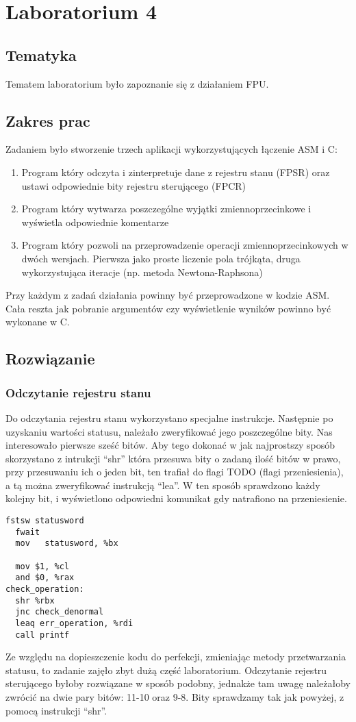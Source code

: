 \chapter{Laboratorium 4}

\section{Tematyka}
Tematem laboratorium było zapoznanie się z działaniem FPU.
\section{Zakres prac}
Zadaniem było stworzenie trzech aplikacji wykorzystujących łączenie ASM i C:
\begin{enumerate}
	\item Program który odczyta i zinterpretuje dane z rejestru stanu (FPSR) oraz ustawi odpowiednie bity rejestru sterującego (FPCR)
	\item Program który wytwarza poszczególne wyjątki zmiennoprzecinkowe i wyświetla odpowiednie komentarze
	\item Program który pozwoli na przeprowadzenie operacji zmiennoprzecinkowych w dwóch wersjach. Pierwsza jako proste liczenie pola trójkąta, druga wykorzystująca iteracje (np. metoda Newtona-Raphsona)
\end{enumerate}
Przy każdym z zadań działania powinny być przeprowadzone w kodzie ASM. Cała reszta jak pobranie argumentów czy wyświetlenie wyników powinno być wykonane w C.

\section{Rozwiązanie}
\subsection{Odczytanie rejestru stanu}
Do odczytania rejestru stanu wykorzystano specjalne instrukcje. Następnie po uzyskaniu wartości statusu, należało zweryfikować jego poszczególne bity. Nas interesowało pierwsze sześć bitów. Aby tego dokonać w jak najprostszy sposób skorzystano z intrukcji "`shr"' która przesuwa bity o zadaną ilość bitów w prawo, przy przesuwaniu ich o jeden bit, ten trafiał do flagi TODO (flagi przeniesienia), a tą można zweryfikować instrukcją "`lea"'. W ten sposób sprawdzono każdy kolejny bit, i wyświetlono odpowiedni komunikat gdy natrafiono na przeniesienie.
\begin{lstlisting}[frame=single, basicstyle=\small, caption=Odczytanie i weryfikacja rejestru stanu]
  fstsw	statusword
  fwait
  mov	statusword, %bx

  mov $1, %cl
  and $0, %rax
check_operation:
  shr %rbx
  jnc check_denormal
  leaq err_operation, %rdi
  call printf
\end{lstlisting}
Ze względu na dopieszczenie kodu do perfekcji, zmieniając metody przetwarzania statusu, to zadanie zajęło zbyt dużą część laboratorium. Odczytanie rejestru sterującego byłoby rozwiązane w sposób podobny, jednakże tam uwagę należałoby zwrócić na dwie pary bitów: 11-10 oraz 9-8. Bity sprawdzamy tak jak powyżej, z pomocą instrukcji "`shr"'. 

